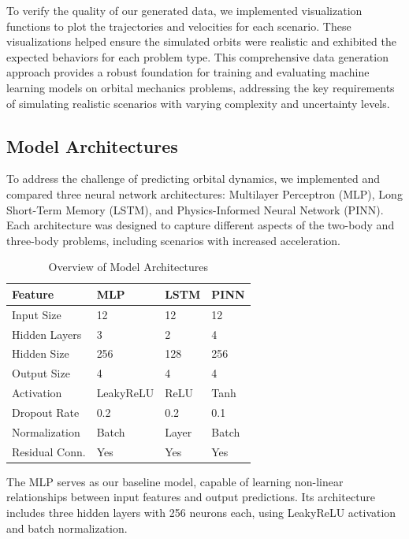 \documentclass[11pt,a4paper, twocolumn]{article}
\begin{document}
To verify the quality of our generated data, we implemented visualization functions to plot the trajectories and velocities for each scenario. These visualizations helped ensure the simulated orbits were realistic and exhibited the expected behaviors for each problem type.
This comprehensive data generation approach provides a robust foundation for training and evaluating machine learning models on orbital mechanics problems, addressing the key requirements of simulating realistic scenarios with varying complexity and uncertainty levels.
\subsection{Model Architectures}

To address the challenge of predicting orbital dynamics, we implemented and compared three neural network architectures: Multilayer Perceptron (MLP), Long Short-Term Memory (LSTM), and Physics-Informed Neural Network (PINN). Each architecture was designed to capture different aspects of the two-body and three-body problems, including scenarios with increased acceleration.

\begin{table}[h]
  \centering
  \scriptsize
  \caption{Overview of Model Architectures}
  \label{tab:model-architectures}
  \begin{tabular}{@{}llll@{}}
  \toprule
  \textbf{Feature} & \textbf{MLP} & \textbf{LSTM} & \textbf{PINN} \\
  \midrule
  Input Size & 12 & 12 & 12 \\
  Hidden Layers & 3 & 2 & 4 \\
  Hidden Size & 256 & 128 & 256 \\
  Output Size & 4 & 4 & 4 \\
  Activation & LeakyReLU & ReLU & Tanh \\
  Dropout Rate & 0.2 & 0.2 & 0.1 \\
  Normalization & Batch & Layer & Batch \\
  Residual Conn. & Yes & Yes & Yes \\
  \bottomrule
  \end{tabular}
  \end{table}

The MLP serves as our baseline model, capable of learning non-linear relationships between input features and output predictions. Its architecture includes three hidden layers with 256 neurons each, using LeakyReLU activation and batch normalization.
\end{document}
